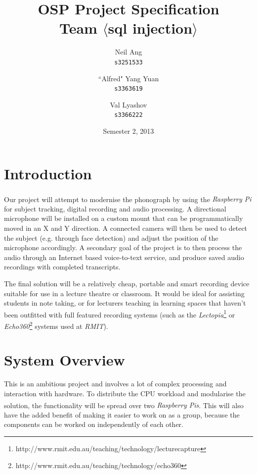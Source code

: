 \documentclass[11pt,a4paper,titlepage]{report}
\title{OSP Project Specification \\ Team $\langle$sql injection$\rangle$}
\author{
  Neil Ang\\
  \texttt{s3251533}
  \and
  ``Alfred" Yang Yuan\\
  \texttt{s3363619}
  \and
  Val Lyashov\\
  \texttt{s3366222}
}
\date{Semester 2, 2013}
\newcommand{\rpi}{\textit{Raspberry Pi\textsuperscript{\textregistered}}}
\newcommand{\rpis}{\textit{Raspberry Pi\textsuperscript{\textregistered}s}}
\begin{document}
\maketitle

\pagebreak
\tableofcontents
\thispagestyle{empty}
\pagebreak

\section{Introduction}

Our project will attempt to modernise the phonograph by using the \rpi\xspace for subject tracking, digital recording and audio processing. A directional microphone will be installed on a custom mount that can be programmatically moved in an X and Y direction. A connected camera will then be used to detect the subject (e.g. through face detection) and adjust the position of the microphone accordingly. A secondary goal of the project is to then process the audio through an Internet based voice-to-text service, and produce saved audio recordings with completed transcripts.

The final solution will be a relatively cheap, portable and smart recording device suitable for use in a lecture theatre or classroom. It would be ideal for assisting students in note taking, or for lecturers teaching in learning spaces that haven't been outfitted with full featured recording systems (such as the \textit{Lectopia}\footnote{http://www.rmit.edu.au/teaching/technology/lecturecapture} or \textit{Echo360}\footnote{http://www.rmit.edu.au/teaching/technology/echo360} systems used at \textit{RMIT}).


\section{System Overview}

This is an ambitious project and involves a lot of complex processing and interaction with hardware. To distribute the CPU workload and modularise the solution, the functionality will be spread over two \rpis. This will also have the added benefit of making it easier to work on as a group, because the components can be worked on independently of each other.
\end{document}
